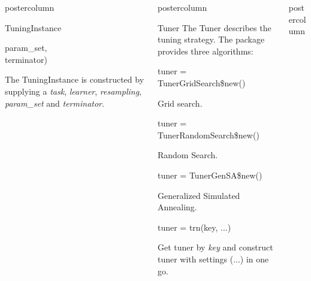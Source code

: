 \documentclass{beamer}
\newlength{\columnheight} %
\begin{document}
\begin{frame}[fragile]{}
\begin{columns}
\begin{column}{.245\textwidth}
\begin{beamercolorbox}[center]{postercolumn}
\begin{minipage}{.98\textwidth}
{\begin{myblock}{TuningInstance}
\begin{codeboxmultiline}[width=18cm]
							\hspace*{1ex}param\_set,\\
							\hspace*{1ex}terminator)
						\end{codeboxmultiline}
						The TuningInstance is constructed by supplying a \textit{task}, \textit{learner}, \textit{resampling}, \textit{param\_set} and \textit{terminator}. 
						\\
					\end{myblock}	
					\vfill}
				\end{minipage}
			\end{beamercolorbox}
		\end{column}
		\begin{column}{.245\textwidth}
			\begin{beamercolorbox}[center]{postercolumn}
				\begin{minipage}{.98\textwidth}
					\parbox[t][\columnheight]{\textwidth}{
						\begin{myblock}{Tuner}
							The Tuner describes the tuning strategy. The package provides three algorithms:
							\\
							\begin{codebox}
								tuner = TunerGridSearch\$new()
							\end{codebox}
							Grid search.
							\\
							\begin{codebox}
								tuner = TunerRandomSearch\$new()
							\end{codebox}
							Random Search.
							\\
							\begin{codebox}
								tuner = TunerGenSA\$new()
							\end{codebox}
							Generalized Simulated Annealing.
							\\
							\begin{codebox}
								tuner = trn(key, ...)
							\end{codebox}
							Get tuner by \textit{key} and construct tuner with settings (...) in one go.
						\end{myblock}
					\vfill}
				\end{minipage}
			\end{beamercolorbox}
		\end{column}
		\begin{column}{.245\textwidth}
			\begin{beamercolorbox}[center]{postercolumn}
				\begin{minipage}{.98\textwidth}

\end{minipage}
\end{beamercolorbox}
\end{column}
\end{columns}
\end{frame}
\end{document}
